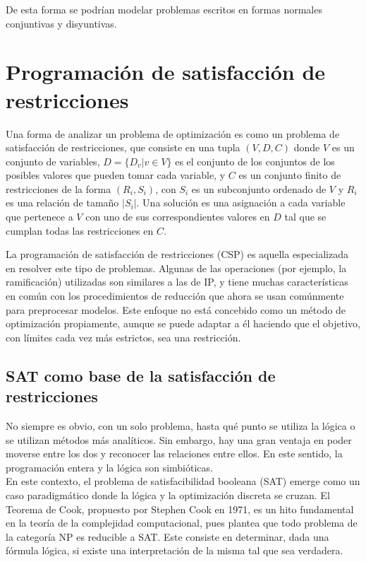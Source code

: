 \documentclass[12pt]{report}
\begin{document}
De esta forma se podrían modelar problemas escritos en formas normales conjuntivas y disyuntivas.

\section{Programación de satisfacción de restricciones}

Una forma de analizar un problema de optimización es como un problema de satisfacción de restricciones, que consiste en una tupla $(V,D,C)$ donde $V$ es un conjunto de variables, $D=\{D_v|v\in V\}$ es el conjunto de los conjuntos de los posibles valores que pueden tomar cada variable, y $C$ es un conjunto finito de restricciones de la forma $(R_i,S_i)$, con $S_i$ es un subconjunto ordenado de $V$ y $R_i$ es una relación de tamaño $|S_i|$. Una solución es una asignación a cada variable que pertenece a $V$ con uno de sus correspondientes valores en $D$ tal que se cumplan todas las restricciones en $C$.

La programación de satisfacción de restricciones (CSP) es aquella especializada en resolver este tipo de problemas. Algunas de las operaciones (por ejemplo, la ramificación) utilizadas son similares a las de IP, y tiene muchas características en común con los procedimientos de reducción que ahora se usan comúnmente para preprocesar modelos. Este enfoque no está concebido como un método de optimización propiamente, aunque se puede adaptar a él haciendo que el objetivo, con límites cada vez más estrictos, sea una restricción.

\subsection{SAT como base de la satisfacción de restricciones}

No siempre es obvio, con un solo problema, hasta qué punto se utiliza la lógica o se utilizan métodos más analíticos. Sin embargo, hay una gran ventaja en poder moverse entre los dos y reconocer las relaciones entre ellos. En este sentido, la programación entera y la lógica son simbióticas.\\

En este contexto, el problema de satisfacibilidad booleana (SAT) emerge como un caso paradigmático donde la lógica y la optimización discreta se cruzan. El Teorema de Cook, propuesto por Stephen Cook en 1971, es un hito fundamental en la teoría de la complejidad computacional, pues plantea que todo problema de la categoría NP es reducible a SAT. Este consiste en determinar, dada una fórmula lógica, si existe una interpretación de la misma tal que sea verdadera.\\ 
\end{document}
